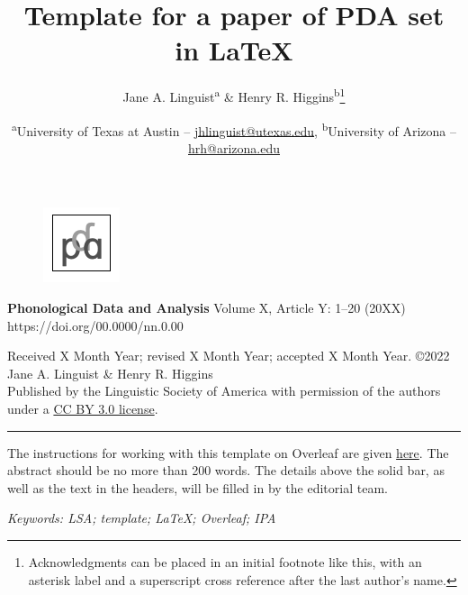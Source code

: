 \documentclass[11pt, letterpaper]{article}
\renewenvironment{abstract}{%
\noindent\begin{minipage}{1\textwidth}
\setlength{\leftskip}{0.38in}
\setlength{\rightskip}{0.38in}}
{\end{minipage}}
\newcommand{\keyword}{\vskip 6pt \par \small \itshape Keywords: }
\renewenvironment{top}{%
\noindent\begin{minipage}{1\textwidth}
\setlength{\leftskip}{0in}
\setlength{\rightskip}{0in}}
{\end{minipage}}
\newcommand{\affiliation}[1]{\date{#1}}
\newcommand{\email}[1] {\href{mailto:#1}{#1}}
\begin{document}

\title{Template for a paper of PDA set in \LaTeX}
\author{
Jane A. Linguist\textsuperscript{a}
\&
Henry R. Higgins\textsuperscript{b}\thanks{Acknowledgments can be placed in an initial footnote like this, with an asterisk label and a superscript cross reference after the last author's name.}}
\affiliation{\sffamily
\textsuperscript{a}University of Texas at Austin -- \email{jhlinguist@utexas.edu}, \newline
\textsuperscript{b}University of Arizona -- \email{hrh@arizona.edu}\newline}

\begin{top}
\begin{minipage}{0.625in}
\begin{figure}[H]
    \includegraphics[scale=.65]{./PDA_logo.png}
\end{figure}
\end{minipage} \hfill
\begin{minipage}{5.75in}
\textbf{Phonological Data and Analysis} Volume X, Article Y: 1--20  (20XX)\\ https://doi.org/00.0000/nn.0.00
\end{minipage}
\footnotesize{Received X Month Year; revised X Month Year; accepted X Month Year. \copyright  2022 Jane A. Linguist \& Henry R. Higgins\\ Published by the Linguistic Society of America with permission of the authors under a  \href{https://creativecommons.org/licenses/by/3.0/}{CC BY 3.0 license}.}
\par\noindent\rule{\textwidth}{0.4pt}
\end{top}


{\let\newpage\relax\maketitle}
\vspace{-12pt}

\begin{abstract}
\small{
The instructions for working with this template on Overleaf are given \href{h}{here}. The abstract should be no more than 200 words. The details above the solid bar, as well as the text in the headers, will be filled in by the editorial team.}
\keyword{
LSA; template; \LaTeX; Overleaf; IPA
}
\end{abstract}
\end{document}
